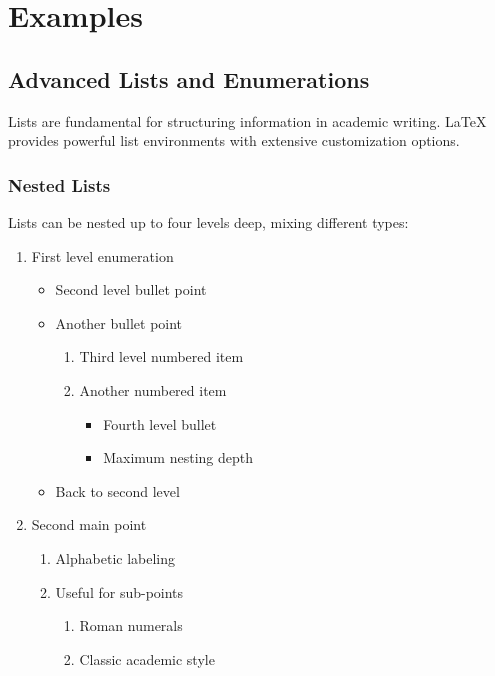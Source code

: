\section{Examples}

\subsection{Advanced Lists and Enumerations}

Lists are fundamental for structuring information in academic writing. LaTeX provides powerful list environments with extensive customization options.

\subsubsection{Nested Lists}

Lists can be nested up to four levels deep, mixing different types:

\begin{enumerate}
    \item First level enumeration
          \begin{itemize}
              \item Second level bullet point
              \item Another bullet point
                    \begin{enumerate}
                        \item Third level numbered item
                        \item Another numbered item
                              \begin{itemize}
                                  \item Fourth level bullet
                                  \item Maximum nesting depth
                              \end{itemize}
                    \end{enumerate}
              \item Back to second level
          \end{itemize}
    \item Second main point
          \begin{enumerate}[label=\alph*)]
              \item Alphabetic labeling
              \item Useful for sub-points
                    \begin{enumerate}[label=\roman*.]
                        \item Roman numerals
                        \item Classic academic style
                    \end{enumerate}
          \end{enumerate}
\end{enumerate}


